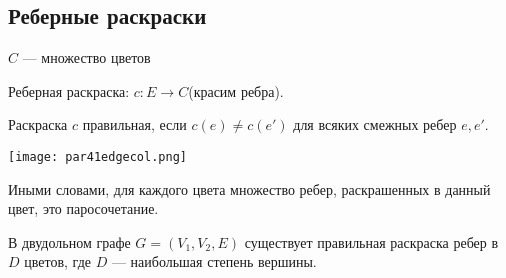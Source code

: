 \subsection{Реберные раскраски}

$C$ --- множество цветов

\begin{defn}
    
    Реберная раскраска: $c: E \to C$(красим ребра).
\end{defn}

\begin{defn}

    Раскраска $c$ правильная, если $c(e) \neq c(e')$ для всяких смежных ребер $e, e'$.
    \begin{center}
        \texttt{[image: par41edgecol.png]}
    \end{center}
    
    Иными словами, для каждого цвета множество ребер, раскрашенных в данный цвет, это паросочетание.
\end{defn}

\begin{theorem}
    В двудольном графе $G = (V_1, V_2, E)$ существует правильная раскраска ребер в $D$ цветов, где $D$ --- наибольшая степень вершины.
\end{theorem}

